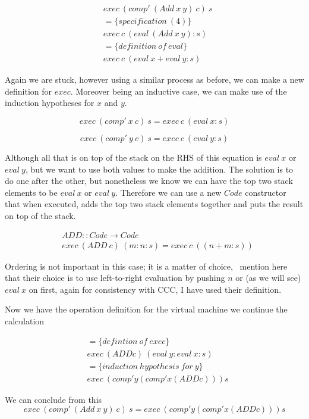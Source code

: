 \documentclass {article}
\begin{document}
\begin{align*}
	&exec \ (comp' \ (Add \ x \ y) \ c) \ s \\
	&= \{specification \ (4) \} \\
	&exec \ c \ (eval \ (Add \ x \ y) : s) \\
	&= \{definition \ of \ eval\} \\
	&exec \ c \ (eval \ x + eval \ y :s)
\end{align*}

Again we are stuck, however using a similar process
as before, we can make a new definition for $exec$.
Moreover being an inductive case, 
we can make use of the induction 
hypotheses for $x$ and $y$\cite{bandh}.

\[exec \ (comp' \ x \ c) \ s = exec \ c \ (eval \ x:s) \]

\[exec \ (comp' \ y \ c) \ s = exec \ c \ (eval \ y:s) \]

Although all that is on top of the stack on the
RHS of this equation is $eval \ x$ or $eval \ y$,
but we want to use both values to make the addition.
The solution is to do one after the other,
but nonetheless we know we can have the top two 
stack elements to be $eval \ x$ or $eval \ y$.
Therefore we can use a new $Code$ constructor
that when executed, adds the top two stack elements
together and puts the result on top of the stack.

\begin{align*}
	&ADD :: Code \rightarrow Code \\
	&exec \ (ADD \ c) \ (m:n:s) = exec \ c \ ((n+m:s))
\end{align*}

Ordering is not important in this case; it is a matter of choice,
\BH\ mention here that their choice is to use
left-to-right evaluation by pushing $n$ 
or (as we will see)  $eval \ x$ on first,
again for consistency with CCC, 
I have used their definition.

Now we have the operation definition for the 
virtual machine we continue the calculation 

\begin{align*}
	&= \{ defintion \ of \ exec \} \\
	&exec \ (ADD c) \ (eval \ y : eval \ x : s) \\
	&= \{ induction \ hypothesis \ for \ y \} \\
	&exec \ (comp' y (comp' x (ADD c))) s
\end{align*}

We can conclude from this 
\[ exec \ (comp' \ (Add \ x \ y) \ c) \ s = exec \ (comp' y (comp' x (ADD c))) s \]
\end{document}
